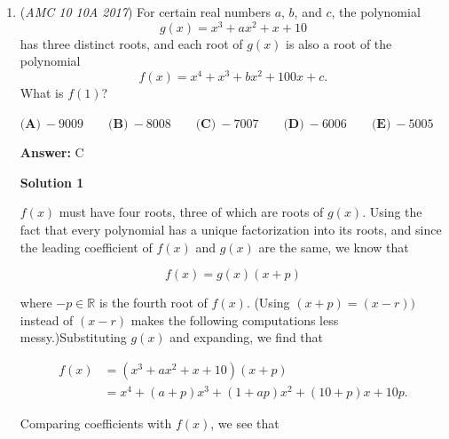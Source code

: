 \begin{enumerate}
\textbf{Solution 2}

There are $5 \times 5 = 25$ total points in all. So, there are $\dbinom{25}3 = 2300$ ways to choose the three vertices for the triangle. However, there are some cases where they 3 points chosen results in a straight line.

 There are $10 \times 10 = 100$ cases where the 3 points chosen make up a vertical or horizontal line.

 There are $2\left(1+\dbinom{4}3+\dbinom{5}3+\dbinom{4}3+1\right)=40$ cases where the 3 points all land on the diagonals of the square.

 There are $3 \times 4=12$ ways where the 3 points make the a slope of $\frac{1}{2}$, $-\frac{1}{2}$, $2$, and $-2$.

 Hence, there are $100+40+12=152$ cases where the chosen 3 points make a line. The answer would be $2300-152=\boxed{(\textbf{B})\ 2148}$

 Video Solutions:

 


	\item (\textit{AMC 10 10A 2017}) For certain real numbers $a$, $b$, and $c$, the polynomial 
 \[g(x) = x^3 + ax^2 + x + 10\]has three distinct roots, and each root of $g(x)$ is also a root of the polynomial 
 \[f(x) = x^4 + x^3 + bx^2 + 100x + c.\]What is $f(1)$?


 $\textbf{(A)}\ -9009\qquad\textbf{(B)}\ -8008\qquad\textbf{(C)}\ -7007\qquad\textbf{(D)}\ -6006\qquad\textbf{(E)}\ -5005$

 \textbf{Answer: }C



\textbf{Solution 1}

$f(x)$ must have four roots, three of which are roots of $g(x)$. Using the fact that every polynomial has a unique factorization into its roots, and since the leading coefficient of $f(x)$ and $g(x)$ are the same, we know that

 
 \[f(x)=g(x)(x+p)\]

 where $-p\in\mathbb{R}$ is the fourth root of $f(x)$. (Using $(x+p) = (x-r))$ instead of $(x-r)$ makes the following computations less messy.)Substituting $g(x)$ and expanding, we find that

 
 \begin{align*}f(x)&=(x^3+ax^2+x+10)(x+p)\\ &=x^4+(a+p)x^3+(1+ap)x^2+(10+p)x+10p.\end{align*}


 Comparing coefficients with $f(x)$, we see that


\end{enumerate}
